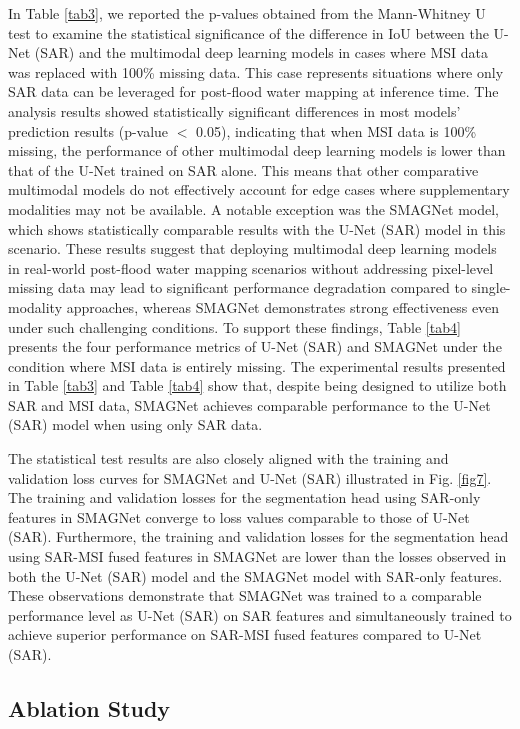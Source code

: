 \documentclass[preprint,12pt,authoryear]{elsarticle}
\begin{document}
In Table \ref{tab3}, we reported the p-values obtained from the Mann-Whitney U test \citep{mann1947test} to examine the statistical significance of the difference in IoU between the U-Net (SAR) and the multimodal deep learning models in cases where MSI data was replaced with 100\% missing data. This case represents situations where only SAR data can be leveraged for post-flood water mapping at inference time. The analysis results showed statistically significant differences in most models’ prediction results (p-value $<$ 0.05), indicating that when MSI data is 100\% missing, the performance of other multimodal deep learning models is lower than that of the U-Net trained on SAR alone. This means that other comparative multimodal models do not effectively account for edge cases where supplementary modalities may not be available. A notable exception was the SMAGNet model, which shows statistically comparable results with the U-Net (SAR) model in this scenario. These results suggest that deploying multimodal deep learning models in real-world post-flood water mapping scenarios without addressing pixel-level missing data may lead to significant performance degradation compared to single-modality approaches, whereas SMAGNet demonstrates strong effectiveness even under such challenging conditions. To support these findings, Table \ref{tab4} presents the four performance metrics of U-Net (SAR) and SMAGNet under the condition where MSI data is entirely missing. The experimental results presented in Table \ref{tab3} and Table \ref{tab4} show that, despite being designed to utilize both SAR and MSI data, SMAGNet achieves comparable performance to the U-Net (SAR) model when using only SAR data.

The statistical test results are also closely aligned with the training and validation loss curves for SMAGNet and U-Net (SAR) illustrated in Fig. \ref{fig7}. The training and validation losses for the segmentation head using SAR-only features in SMAGNet converge to loss values comparable to those of U-Net (SAR). Furthermore, the training and validation losses for the segmentation head using SAR-MSI fused features in SMAGNet are lower than the losses observed in both the U-Net (SAR) model and the SMAGNet model with SAR-only features. These observations demonstrate that SMAGNet was trained to a comparable performance level as U-Net (SAR) on SAR features and simultaneously trained to achieve superior performance on SAR-MSI fused features compared to U-Net (SAR).


\subsection{Ablation Study}
\label{Section5.3}
\end{document}
